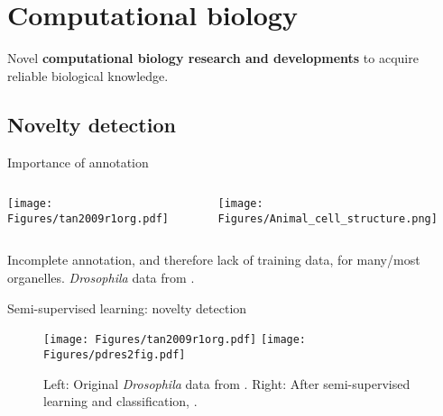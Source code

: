 \section{Computational biology}

\begin{frame}{}
  \begin{center}
    \Large{Novel \textbf{computational biology research and developments}
    to acquire reliable biological knowledge.}
  \end{center}
\end{frame}

\subsection{Novelty detection}

\begin{frame}{Importance of annotation}

  \begin{columns}[t]
    \begin{column}[T]{0.43\textwidth}
      \begin{centering}
        \texttt{[image: Figures/tan2009r1org.pdf]}
      \end{centering}
    \end{column}
    \begin{column}[T]{0.56\textwidth}
      \texttt{[image: Figures/Animal\_cell\_structure.png]}
    \end{column}
  \end{columns}
  Incomplete annotation, and therefore lack of training data, for
  many/most organelles. \textit{Drosophila} data from \cite{Tan2009}.
\end{frame}

\begin{frame}{Semi-supervised learning: novelty detection}
  \begin{figure}
    \texttt{[image: Figures/tan2009r1org.pdf]}
    \texttt{[image: Figures/pdres2fig.pdf]}
    \caption{Left: Original \textit{Drosophila} data from
      \cite{Tan2009}. Right: After semi-supervised learning and
      classification, \cite{Breckels:2013}.}
  \end{figure}
\end{frame}

